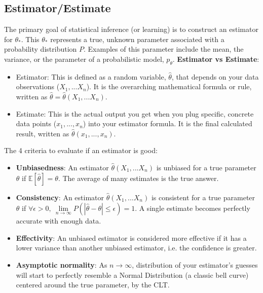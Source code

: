 \documentclass[../Probability.tex]{subfiles}
\begin{document}
\subsection{Estimator/Estimate}
The primary goal of statistical inference (or learning) is to construct an estimator for $\theta_{*}$.\newline
This $\theta_{*}$ represents a true, unknown parameter associated with a probability distribution $P$.\newline
Examples of this parameter include the mean, the variance, or the parameter of a probabilistic model, $p_{\theta}$.\newline
\textbf{Estimator vs Estimate}:
\begin{itemize}
    \item Estimator: This is defined as a random variable, $\hat{\theta}$, that depends on your data observations ($X_{1},...X_{n}$). It is the overarching mathematical formula or rule, written as $\hat{\theta}=\hat{\theta}(X_{1},...X_{n})$.
    \item Estimate: This is the actual output you get when you plug specific, concrete data points ($x_{1},...,x_{n}$) into your estimator formula. It is the final calculated result, written as $\hat{\theta}(x_{1},...,x_{n})$.
\end{itemize}
The 4 criteria to evaluate if an estimator is good:
\begin{itemize}
    \item \textbf{Unbiasedness}: An estimator $\hat{\theta}(X_{1},...X_{n})$ is unbiased for a true parameter $\theta$ if $\mathbb{E}[\hat{\theta}]=\theta$. The average of many estimates is the true answer.
    \item \textbf{Consistency}: An estimator $\hat{\theta}(X_{1},...X_{n})$ is consistent for a true parameter $\theta$ if $\forall \epsilon > 0,\:\lim\limits_{n\rightarrow\infty}P(|\hat{\theta}-\theta|\le\epsilon)=1$. A single estimate becomes perfectly accurate with enough data.
    \item \textbf{Effectivity}: An unbiased estimator is considered more effective if it has a lower variance than another unbiased estimator, i.e. the confidence is greater.
    \item \textbf{Asymptotic normality}: As $n \to \infty$, distribution of your estimator's guesses will start to perfectly resemble a Normal Distribution (a classic bell curve) centered around the true parameter, by the CLT.
\end{itemize}
\end{document}
